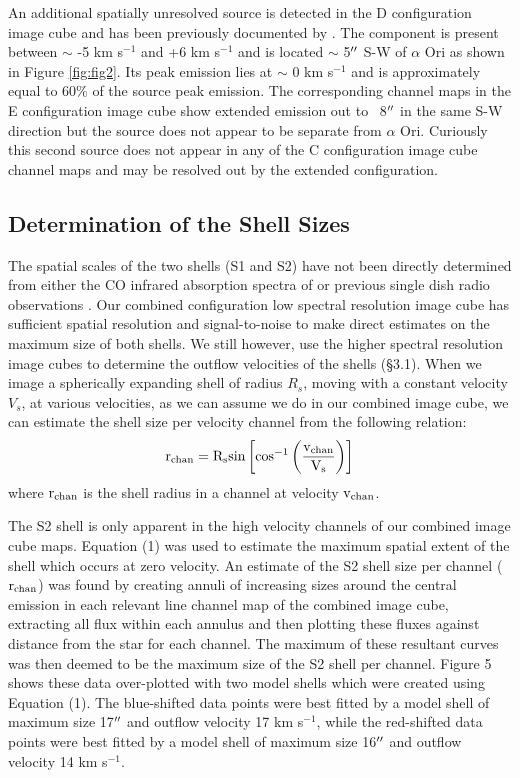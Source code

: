 \documentclass[preprint2]{aastex}
\begin{document}
An additional spatially unresolved source is detected in the D configuration image cube and has been previously documented by \citet{2009AIPC.1094..868H}. The component is present between $\sim$ -5 km s${}^{-1}$ and +6 km s${}^{-1}$ and is located $\sim$ 5$\mbox{$^{\prime\prime}$}$ S-W of $\alpha$ Ori as shown in Figure \ref{fig:fig2}. Its peak emission lies at $\sim$ 0 km s${}^{-1}$ and is approximately equal to 60$\%$ of the source peak emission. The corresponding channel maps in the E configuration image cube show extended emission out to ~8$\mbox{$^{\prime\prime}$}$ in the same S-W direction but the source does not appear to be separate from $\alpha$ Ori. Curiously this second source does not appear in any of the C configuration image cube channel maps and may be resolved out by the extended configuration.

\subsection{Determination of the Shell Sizes} \label{results3} 
The spatial scales of the two shells (S1 and S2) have not been directly determined from either the CO infrared absorption spectra of \cite{1979ApJ...233L.135B} or previous single dish radio observations \citep{1980ApJ...242L..25K, 1987ApJ...313..400H, 1994ApJ...424L.127H}. Our combined configuration low spectral resolution image cube has sufficient spatial resolution and signal-to-noise to make direct estimates on the maximum size of both shells. We still however, use the higher spectral resolution image cubes to determine the outflow velocities of the shells (\S3.1). When we image a spherically expanding shell of radius $R_{s}$,  moving with a constant velocity $V_{s}$, at various velocities, as we can assume we do in our combined image cube, we can estimate the shell size per velocity channel from the following relation:
\begin{equation}
\rm{r_{chan}}=R_{s} \rm{sin}\left[\rm{cos}^{-1}\left(\frac{v_{chan}}{V_{s}}\right) \right]
\end{equation} 
where $\rm{r_{chan}}$ is the shell radius in a channel at velocity $\rm{v_{chan}}$. 

The S2 shell is only apparent in the high velocity channels of our combined image cube maps. Equation (1) was used to estimate the maximum spatial extent of the shell which occurs at zero velocity. An estimate of the S2 shell size per channel ($\rm{r_{chan}}$) was found by creating annuli of increasing sizes around the central emission in each relevant line channel map of the combined image cube, extracting all flux within each annulus and then plotting these fluxes against distance from the star for each channel. The maximum of these resultant curves was then deemed to be the maximum size of the S2 shell per channel. Figure 5 shows these data over-plotted with two model shells which were created using Equation (1). The blue-shifted data points were best fitted by a model shell of maximum size 17$\mbox{$^{\prime\prime}$}$ and outflow velocity 17 km s${}^{-1}$, while the red-shifted data points were best fitted by a model shell of maximum size 16$\mbox{$^{\prime\prime}$}$ and outflow velocity 14 km s${}^{-1}$.
\end{document}
